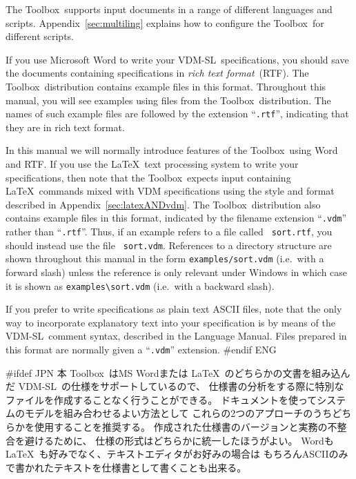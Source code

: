 \documentclass[\pformat,12pt]{article}
\newcommand{\vdmslpp}{VDM-SL}
\newcommand{\Toolbox}{Toolbox}
\newcommand{\vdmext}{vdm}
\newcommand{\vdmslpp}{VDM++}
\newcommand{\Toolbox}{Toolbox}
\newcommand{\vdmext}{vpp}
\begin{document}
The \Toolbox\ supports input documents in a range of different
languages and scripts. 
Appendix~\ref{sec:multiling} explains how to 
configure the \Toolbox\ for different scripts. 

If you use Microsoft Word to write your \vdmslpp\ specifications, you
should save the documents containing specifications in {\em rich text
  format\/}~(RTF). The \Toolbox\ distribution contains example files in
this format. Throughout this manual, you will see examples using files
from the \Toolbox\ distribution. The names of such example files are
followed by the extension ``{\tt .rtf}'', indicating that they are in
rich text format. 

In this manual we will normally introduce features of the \Toolbox\ 
using Word and RTF.  If you use the \LaTeX\ text processing system to
write your specifications, then note that the \Toolbox\ expects input
containing \LaTeX\ commands mixed with VDM specifications using the
style and format described in Appendix~\ref{sec:latexANDvdm}. The
\Toolbox\ distribution also contains example files in this format,
indicated by the filename extension ``{\tt .\vdmext}'' rather than
``{\tt .rtf}''.  Thus, if an example refers to a file called {\tt
  sort.rtf}, you should instead use the file {\tt
  sort.\vdmext}. References to a directory structure are shown
throughout this manual in the form {\tt examples/sort.vdm} (i.e.\ with a
forward slash)   unless the reference is only relevant under Windows
in which case  it is shown as \verb+examples\sort.vdm+ (i.e.\ with a
backward slash).

If you prefer to write specifications as plain text ASCII files, 
note that the only way to incorporate explanatory text into your
specification is by means of the \vdmslpp\ comment syntax, described
in the Language Manual. Files prepared in this format are normally
given a ``{\tt .\vdmext}'' extension.
#endif ENG

#ifdef JPN
本 \Toolbox\ はMS Wordまたは \LaTeX\ のどちらかの文書を組み込んだ \vdmslpp\ の仕様をサポートしているので、
仕様書の分析をする際に特別なファイルを作成することなく行うことができる。
ドキュメントを使ってシステムのモデルを組み合わせるよい方法として
これらの2つのアプローチのうちどちらかを使用することを推奨する。
作成された仕様書のバージョンと実務の不整合を避けるために、
仕様の形式はどちらかに統一したほうがよい。
Wordも \LaTeX\ も好みでなく、テキストエディタがお好みの場合は
もちろんASCIIのみで書かれたテキストを仕様書として書くことも出来る。
\end{document}

